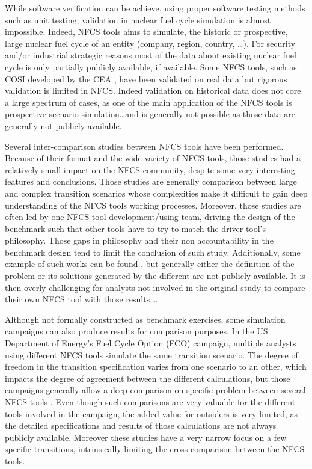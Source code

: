 While software verification can be achieve, using proper software testing
methods such as unit testing, validation in nuclear fuel cycle
simulation is almost impossible. Indeed, NFCS tools aims to simulate, the
historic or prospective, large nuclear fuel cycle of an entity (company, region,
country, \ldots). For security and/or industrial strategic reasons most
of the data about existing nuclear fuel cycle is only partially publicly
available, if available.
Some NFCS tools, such as COSI developed by the CEA \cite{COSI6 - Coquelet}, have
been validated on real data but rigorous validation is limited in NFCS. Indeed
validation on historical data does not core a large spectrum of cases, as one of the main
application of the NFCS tools is prospective scenario simulation\ldots and is
generally not possible as those data are generally not publicly available.

Several inter-comparison studies between NFCS tools have been performed. Because
of their format and the wide variety of NFCS tools, those studies had a
relatively small impact on the NFCS community, despite some very interesting
features and conclusions.  Those studies are generally comparison between large
and complex transition scenarios whose complexities make it difficult to gain
deep understanding of the NFCS tools working processes. Moreover, those studies are
often led by one NFCS tool development/using team, driving the design of
the benchmark such that other tools have to try to match the driver tool's
philosophy. Those gaps in philosophy and their non accountability in the
benchmark design tend to limit the conclusion of such study. Additionally, some
example of such works can be found \cite{IAEA - Benchmark Study on Nuclear Fuel Cycle
Transition Scenarios} \cite{MIT - Guerin}, but generally either the definition
of the problem or its solutions generated by the different are not publicly
available. It is then overly challenging for analysts not involved in the original
study to compare their own NFCS tool with those results.\ldots

Although not formally constructed as benchmark exercises, some simulation campaigns
can also produce results for comparison purposes.  In the US Department of Energy's
Fuel Cycle Option (FCO) campaign,  multiple analysts
using different NFCS tools simulate the same transition scenario. The degree of
freedom in the transition specification varies from one scenario to an other,
which impacts the degree of agreement between the different calculations, but
those campaigns generally allow a deep comparison on specific problem between
several NFCS tools \cite{Standardized verification of fuel cycle modeling -
B.Feng}.  Even though such comparisons are very valuable for the different tools
involved in the campaign, the added value for outsiders is very limited, as the
detailed specifications and results of those calculations are not always
publicly available. Moreover these studies have a very narrow focus on a few
specific transitions, intrinsically limiting the cross-comparison between the
NFCS tools.


